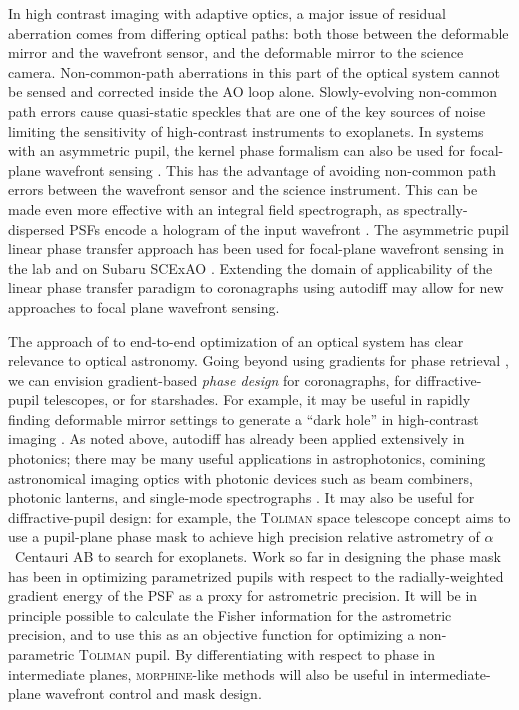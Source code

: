 \documentclass[modern]{aastex63}
\begin{document}
In high contrast imaging with adaptive optics, a major issue of residual aberration comes from differing optical paths: both those between the deformable mirror and the wavefront sensor, and the deformable mirror to the science camera. Non-common-path aberrations in this part of the optical system cannot be sensed and corrected inside the AO loop alone. Slowly-evolving non-common path errors cause quasi-static speckles that are one of the key sources of noise limiting the sensitivity of high-contrast instruments to exoplanets. In systems with an asymmetric pupil, the kernel phase formalism can also be used for focal-plane wavefront sensing \citep{martinache13}. This has the advantage of avoiding non-common path errors between the wavefront sensor and the science instrument. %
This can be made even more effective with an integral field spectrograph, as spectrally-dispersed PSFs encode a hologram of the input wavefront \citep{martinache16}. The asymmetric pupil linear phase transfer approach has been used for focal-plane wavefront sensing in the lab \citep[e.g.][]{pope14,swift} and on Subaru SCExAO \citep{martinache16b}. Extending the domain of applicability of the linear phase transfer paradigm to coronagraphs using autodiff may allow for new approaches to focal plane wavefront sensing. 

The approach of \citet{sitzmann2018} to end-to-end optimization of an optical system has clear relevance to optical astronomy. Going beyond using gradients for phase retrieval \citep{jurling14}, we can envision gradient-based \textit{phase design} for coronagraphs,  for diffractive-pupil telescopes, or for starshades. For example, it may be useful in rapidly finding deformable mirror settings to generate a ``dark hole'' in high-contrast imaging \citep[e.g.][]{malbet95,currie20}. As noted above, autodiff has already been applied extensively in photonics; there may be many useful applications in astrophotonics, comining astronomical imaging optics with photonic devices such as beam combiners, photonic lanterns, and single-mode spectrographs \citep{jbh17,minardi20}. It may also be useful for diffractive-pupil design: for example, the \textsc{Toliman} space telescope concept \citep{tuthill18,bendek18} aims to use a pupil-plane phase mask to achieve high precision relative astrometry of $\alpha$~Centauri AB to search for exoplanets. Work so far in designing the phase mask has been in optimizing parametrized pupils with respect to the radially-weighted gradient energy of the PSF as a proxy for astrometric precision. It will be in principle possible to calculate the Fisher information for the astrometric precision, and to use this as an objective function for optimizing a non-parametric \textsc{Toliman} pupil. By differentiating with respect to phase in intermediate planes, \textsc{morphine}-like methods will also be useful in intermediate-plane wavefront control and mask design.
\end{document}
